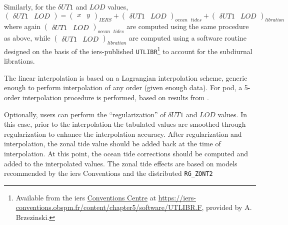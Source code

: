 Similarly, for the $\delta UT1$ and $LOD$ values, 
\begin{equation}
    \begin{pmatrix} \delta UT1 & LOD \end{pmatrix} = 
    \begin{pmatrix} x & y \end{pmatrix}_{IERS} + 
    \begin{pmatrix} \delta UT1 & LOD  \end{pmatrix}_{ocean\text{ }tides} + 
    \begin{pmatrix} \delta UT1 & LOD  \end{pmatrix}_{libration} 
\end{equation}
where again $\begin{pmatrix} \delta UT1 & LOD  \end{pmatrix}_{ocean\text{ }tides}$ 
are computed using the same procedure as above, while $\begin{pmatrix} \delta UT1 & LOD  \end{pmatrix}_{libration}$ 
are computed using a software routine designed on the basis of the \gls{iers}-published 
\texttt{UTLIBR}\footnote{Available from the \gls{iers} \href{https://iers-conventions.obspm.fr/}{Conventions Centre} at \url{https://iers-conventions.obspm.fr/content/chapter5/software/UTLIBR.F}, provided by A. Brzezinski.\label{fn:utlibr-f}} 
to account for the subdiurnal librations.

The linear interpolation is based on a Lagrangian interpolation scheme, generic enough to 
perform interpolation of any order (given enough data). For \gls{pod}, a 5-order 
interpolation procedure is performed, based on results from \cite{Bradley2016}. 

Optionally, users can perform the ``regularization'' of $\delta UT1$ and $LOD$ values. 
In this case, prior to the interpolation the tabulated values are smoothed through 
regularization to enhance the interpolation accuracy. After regularization and 
interpolation, the zonal tide value should be added back at the time of interpolation.
At this point, the ocean tide corrections should be computed and added to the 
interpolated values. The zonal tide effects are based on models recommended by 
the \gls{iers} Conventions and the distributed \texttt{RG\_ZONT2}

